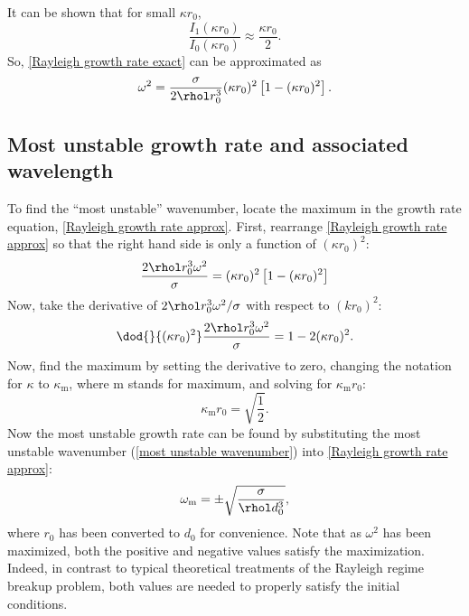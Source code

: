 \documentclass[ccbysa,note,git]{bmtreport}
\begin{document}
It can be shown that for small $\kappa r_0$,
\begin{equation}
   \frac{I_1(\kappa r_0)}{I_0(\kappa r_0)} \approx \frac{\kappa r_0}{2}.
\end{equation}
So, \eqref{Rayleigh growth rate exact} can be approximated as
\begin{equation}
   \omega^2 = \frac{\sigma}{2 \rhol r_0^3} (\kappa r_0)^2 \left[1 - (\kappa r_0)^2\right]. \label{eq:Rayleigh growth rate approx}
\end{equation}

\subsection{Most unstable growth rate and associated wavelength}

To find the ``most unstable'' wavenumber, locate the maximum in the growth rate equation, \eqref{Rayleigh growth rate approx}. First, rearrange \eqref{Rayleigh growth rate approx} so that the right hand side is only a function of $(\kappa r_0)^2$:
\begin{equation}
   \frac{2 \rhol r_0^3 \omega^2}{\sigma} = (\kappa r_0)^2 \left[1 - (\kappa r_0)^2\right]
\end{equation}
Now, take the derivative of $2 \rhol r_0^3 \omega^2 / \sigma$ with respect to $(k r_0)^2$:
\begin{equation}
   \dod{}{{(\kappa r_0)^2}} \frac{2 \rhol r_0^3 \omega^2}{\sigma} = 1 - 2 (\kappa r_0)^2.
\end{equation}
Now, find the maximum by setting the derivative to zero, changing the notation for $\kappa$ to $\kappa_\text{m}$, where m stands for maximum, and solving for $\kappa_\text{m} r_0$:
\begin{equation}
   \kappa_\text{m} r_0 = \sqrt{\frac{1}{2}}. \label{eq:most unstable wavenumber}
\end{equation}
Now the most unstable growth rate can be found by substituting the most unstable wavenumber (\eqref{most unstable wavenumber}) into \eqref{Rayleigh growth rate approx}:
\begin{equation}
   \omega_\text{m} = \pm \sqrt{\frac{\sigma}{\rhol d_0^3}}, \label{eq:most unstable growth rate}
\end{equation}
where $r_0$ has been converted to $d_0$ for convenience. Note that as $\omega^2$ has been maximized, both the positive and negative values satisfy the maximization. Indeed, in contrast to typical theoretical treatments of the Rayleigh regime breakup problem, both values are needed to properly satisfy the initial conditions.
\end{document}
